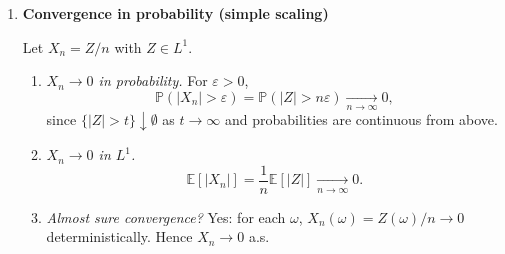 \documentclass[11pt]{article}
\begin{document}
\begin{enumerate}
\begin{enumerate}
\item \emph{Support of $(U,V)$.}
Constraints $0\le x\le 1$, $0\le y\le 1$ become
\[
0\le \frac{u+v}{2}\le 1
\quad\text{and}\quad
0\le \frac{u-v}{2}\le 1,
\]
i.e.
\[
0\le u+v \le 2,\qquad 0\le u-v \le 2.
\]
Equivalently:
\[
-u \le v \le 2-u,\qquad u-2 \le v \le u.
\]
Also $u=x+y\in[0,2]$. The support is the diamond (parallelogram) in the $(u,v)$-plane.

\item \emph{Joint density $f_{U,V}$.}
On the support, by change of variables
\[
f_{U,V}(u,v)= f_{X,Y}\!\left(\tfrac{u+v}{2},\tfrac{u-v}{2}\right)\cdot
\left|\det \frac{\partial(x,y)}{\partial(u,v)}\right|
=1\cdot \frac12=\frac12,
\]
and $f_{U,V}(u,v)=0$ outside the support.

\item \emph{Marginal density of $U$ and its law.}
For fixed $u\in[0,2]$, the admissible $v$ range length is:
\[
\ell(u)=
\begin{cases}
2u, & 0\le u\le 1,\\
2(2-u), & 1\le u\le 2,
\end{cases}
\]
since the intersection of the two $v$-intervals above has that length.
Thus
\[
f_U(u)=\int f_{U,V}(u,v)\,dv = \frac12\,\ell(u)
=
\begin{cases}
u, & 0\le u\le 1,\\
2-u, & 1\le u\le 2,\\
0, & \text{otherwise}.
\end{cases}
\]
So $U=X+Y$ has the \emph{triangular} distribution on $[0,2]$.
\end{enumerate}

\bigskip

\item \textbf{Convergence in probability (simple scaling)}

Let $X_n=Z/n$ with $Z\in L^1$.

\begin{enumerate}
\item \emph{$X_n\to 0$ in probability.}
For $\varepsilon>0$,
\[
\mathbb{P}(|X_n|>\varepsilon)=\mathbb{P}(|Z|>n\varepsilon)\xrightarrow[n\to\infty]{}0,
\]
since $\{|Z|>t\}\downarrow \emptyset$ as $t\to\infty$ and probabilities are continuous from above.

\item \emph{$X_n\to 0$ in $L^1$.}
\[
\mathbb{E}[|X_n|]=\frac{1}{n}\mathbb{E}[|Z|]\xrightarrow[n\to\infty]{}0.
\]

\item \emph{Almost sure convergence?}
Yes: for each $\omega$, $X_n(\omega)=Z(\omega)/n\to 0$ deterministically. Hence $X_n\to0$ a.s.
\end{enumerate}


\end{enumerate}
\end{document}
